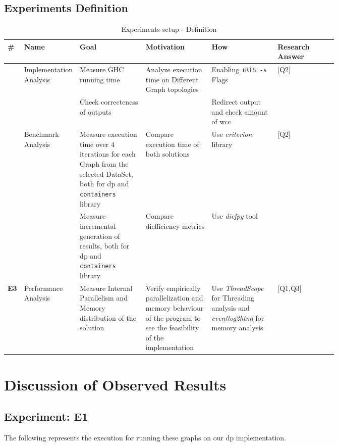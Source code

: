 \documentclass[preprint]{elsarticle}
\begin{document}
\subsection{Experiments Definition}
\begin{table}[H]
  \centering
  \begin{tabular}{|l|p{0.16\linewidth}|p{0.2\linewidth}|p{0.2\linewidth}|p{0.2\linewidth}|l|}
   \hline
   \textbf{\#} & \textbf{Name} & \textbf{Goal} & \textbf{Motivation} & \textbf{How} & \textbf{Research Answer} \\
   \hline
   \rule{0pt}{3ex}
   \multirow{2}{*}{\textbf{E1}} & Implementation Analysis & Measure GHC running time & Analyze execution time on Different Graph topologies & Enabling \texttt{+RTS -s} Flags & [Q2]  \\
   \cline{3-3} \cline{5-5} \rule{0pt}{3ex}
   & & Check correcteness of outputs &  & Redirect output and check amount of \acrshort{wcc} & \\
   \hline
    \rule{0pt}{3ex}
   \multirow{2}{*}{\textbf{E2}} & Benchmark Analysis & Measure execution time over $4$ iterations for each Graph from the selected DataSet, both for \acrshort{dp} and \texttt{containers} library & Compare execution time of both solutions & Use \emph{criterion} \cite{criterion} library  & [Q2] \\
   \cline{3-5} \rule{0pt}{3ex}
   & & Measure incremental generation of results, both for \acrshort{dp} and \texttt{containers} library & Compare diefficiency metrics & Use \emph{diefpy} \cite{diefpy} tool  & \\
   \hline
   \rule{0pt}{3ex}
   \textbf{E3} & Performance Analysis &Measure Internal Parallelism and Memory distribution of the solution & Verify empirically parallelization and memory behaviour of the program to see the feasibility of the implementation & Use \emph{ThreadScope} \cite{threadscope} for Threading analysis and \emph{eventlog2html} \cite{eventlog2html} for memory analysis & [Q1,Q3]\\
   \hline
  \end{tabular}
 \caption{Experiments setup - Definition}
 \label{table:exp:1}
 \end{table}


\section{\textbf{Discussion of Observed Results}}

\subsection{Experiment: E1}\label{sub:sec:e1}
The following represents the execution for running these graphs on our \acrshort{dp} implementation.
\end{document}
